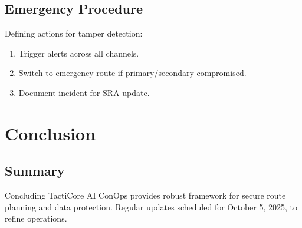 \documentclass[a4paper,12pt]{report}
\begin{document}
\section{Emergency Procedure}
Defining actions for tamper detection:
\begin{enumerate}[leftmargin=*]
    \item Trigger alerts across all channels.
    \item Switch to emergency route if primary/secondary compromised.
    \item Document incident for SRA update.
\end{enumerate}

\chapter{Conclusion}
\section{Summary}
Concluding TactiCore AI ConOps provides robust framework for secure route planning and data protection. Regular updates scheduled for October 5, 2025, to refine operations.
\end{document}
